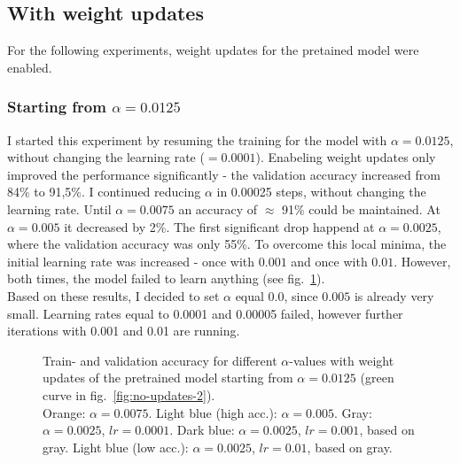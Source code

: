 \documentclass[10pt,twocolumn,letterpaper]{article}
\begin{document}
\subsection{With weight updates}
For the following experiments, weight updates for the pretained model were enabled.
\subsubsection{Starting from $\alpha=0.0125$}\label{updates}
I started this experiment by resuming the training for the model with $\alpha=0.0125$, without changing the learning rate ($=0.0001$).
Enabeling weight updates only improved the performance significantly - the validation accuracy increased from 84\% to 91,5\%.
I continued reducing $\alpha$ in 0.00025 steps, without changing the learning rate.
Until $\alpha=0.0075$ an accuracy of $\approx$ 91\% could be maintained.
At $\alpha=0.005$ it decreased by 2\%.
The first significant drop happend at $\alpha=0.0025$, where the validation accuracy was only 55\%.
To overcome this local minima, the initial learning rate was increased - once with $0.001$ and once with $0.01$.
However, both times, the model failed to learn anything (see fig.~\ref{fig:updates}).\\
Based on these results, I decided to set $\alpha$ equal 0.0, since $0.005$ is already very small.
Learning rates equal to 0.0001 and 0.00005 failed, however further iterations with 0.001 and 0.01 are running.
\begin{figure}[hpbt]
	\centering
	\centering
	\hspace{0.1\textwidth}
	\caption[]{Train- and validation accuracy for different $\alpha$-values with weight updates of the pretrained model starting from $\alpha=0.0125$ (green curve in fig.~\ref{fig:no-updates-2}).\\
		Orange: $\alpha=0.0075$.
		Light blue (high acc.): $\alpha=0.005$.
		Gray: $\alpha=0.0025$, $lr=0.0001$.
		Dark blue: $\alpha=0.0025$, $lr=0.001$, based on gray.
		Light blue (low acc.): $\alpha=0.0025$, $lr=0.01$, based on gray.}
	\label{fig:updates}
\end{figure}
\end{document}
